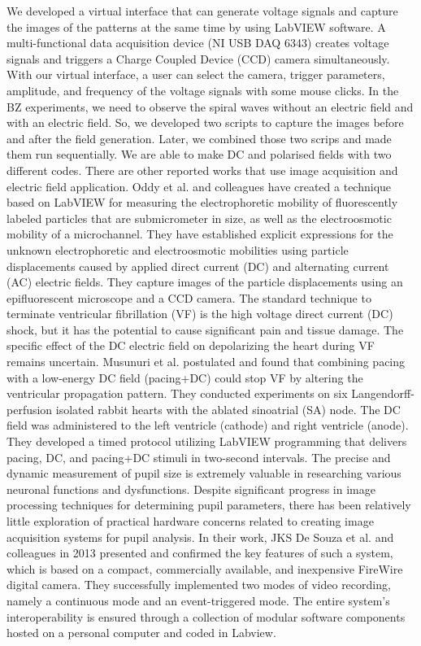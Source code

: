 \documentclass[journal=jacsat,manuscript=article]{achemso}
\begin{document}
We developed a virtual interface that can generate voltage signals and capture the images of the patterns at the same time by using LabVIEW software. A  multi-functional data acquisition device (NI USB DAQ 6343)  creates voltage signals and triggers a  Charge Coupled Device (CCD) camera simultaneously. With our virtual interface, a user can select the camera, trigger parameters, amplitude, and frequency of the voltage signals with some mouse clicks. In the BZ experiments, we need to observe the spiral waves without an electric field and with an electric field. So, we developed two scripts to capture the images before and after the field generation. Later, we combined those two scrips and made them run sequentially. We are able to make DC and polarised fields with two different codes.
There are other reported works that use image acquisition and electric field application. \cite{oddy2004method} Oddy et al. and colleagues have created a technique based on LabVIEW for measuring the electrophoretic mobility of fluorescently labeled particles that are submicrometer in size, as well as the electroosmotic mobility of a microchannel. They have established explicit expressions for the unknown electrophoretic and electroosmotic mobilities using particle displacements caused by applied direct current (DC) and alternating current (AC) electric fields. They capture images of the particle displacements using an epifluorescent microscope and a CCD camera.
The standard technique to terminate ventricular fibrillation (VF) is the high voltage direct current (DC) shock, but it has the potential to cause significant pain and tissue damage. The specific effect of the DC electric field on depolarizing the heart during VF remains uncertain. \cite{musunuri2009ventricular} Musunuri et al. postulated and found that combining pacing with a low-energy DC field (pacing+DC) could stop VF by altering the ventricular propagation pattern. They conducted experiments on six Langendorff-perfusion isolated rabbit hearts with the ablated sinoatrial (SA) node. The DC field was administered to the left ventricle (cathode) and right ventricle (anode). They developed a timed protocol utilizing LabVIEW programming that delivers pacing, DC, and pacing+DC stimuli in two-second intervals.
The precise and dynamic measurement of pupil size is extremely valuable in researching various neuronal functions and dysfunctions. Despite significant progress in image processing techniques for determining pupil parameters, there has been relatively little exploration of practical hardware concerns related to creating image acquisition systems for pupil analysis. In their work, JKS De Souza et al. \cite{ji2013experimental} and colleagues in 2013 presented and confirmed the key features of such a system, which is based on a compact, commercially available, and inexpensive FireWire digital camera. They successfully implemented two modes of video recording, namely a continuous mode and an event-triggered mode. The entire system's interoperability is ensured through a collection of modular software components hosted on a personal computer and coded in Labview. 
\end{document}
